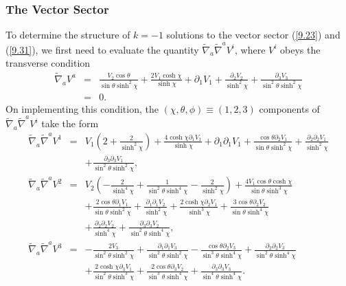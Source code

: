 \subsubsection{The Vector Sector}
\label{sss:vector_sector}

To determine the structure of $k=-1$ solutions to the vector sector  (\ref{9.23}) and (\ref{9.31}), we first need to evaluate the quantity $\tilde{\nabla}_a\tilde{\nabla}^aV^i$, where $V^i$ obeys the transverse condition 
%
\begin{eqnarray}
\tilde\nabla_a V^a&=& \frac{V_{2} \cos\theta}{\sin\theta \sinh^2\chi} + \frac{2 V_{1} \cosh\chi}{\sinh\chi} + \partial_{1}V_{1} + \frac{\partial_{2}V_{2}}{\sinh^2\chi} + \frac{\partial_{3}V_{3}}{\sin^2\theta \sinh^2\chi}
\nonumber\\
&=&0.
\label{10.20b}
\end{eqnarray}
%
On implementing this condition, the $(\chi,\theta,\phi) \equiv (1,2,3)$ components of $\tilde{\nabla}_a\tilde{\nabla}^aV^i$ take the form
% 
\begin{eqnarray}
\tilde{\nabla}_a\tilde{\nabla}^aV^1&=&V_{1} \left(2 + \frac{2}{\sinh^2\chi}\right) + \frac{4 \cosh\chi \partial_{1}V_{1}}{\sinh\chi} + \partial_{1}\partial_{1}V_{1} + \frac{\cos\theta \partial_{2}V_{1}}{\sin\theta \sinh^2\chi} + \frac{\partial_{2}\partial_{2}V_{1}}{\sinh^2\chi}
\nonumber\\
&& + \frac{\partial_{3}\partial_{3}V_{1}}{\sin^2\theta \sinh^2\chi},
\nonumber\\ 
\tilde{\nabla}_a\tilde{\nabla}^aV^2&=& V_{2} \left(- \frac{2}{\sinh^4\chi} + \frac{1}{\sin^2\theta \sinh^4\chi} -  \frac{2}{\sinh^2\chi}\right) + \frac{4 V_{1} \cos\theta \cosh\chi}{\sin\theta \sinh^3\chi}
\nonumber\\
&& + \frac{2 \cos\theta \partial_{1}V_{1}}{\sin\theta \sinh^2\chi} + \frac{\partial_{1}\partial_{1}V_{2}}{\sinh^2\chi}  + \frac{2 \cosh\chi \partial_{2}V_{1}}{\sinh^3\chi} + \frac{3 \cos\theta \partial_{2}V_{2}}{\sin\theta \sinh^4\chi}
\nonumber\\
&& + \frac{\partial_{2}\partial_{2}V_{2}}{\sinh^4\chi} + \frac{\partial_{3}\partial_{3}V_{2}}{\sin^2\theta \sinh^4\chi},
\nonumber\\ 
\tilde{\nabla}_a\tilde{\nabla}^aV^3&=& - \frac{2 V_{3}}{\sin^2\theta \sinh^2\chi} + \frac{\partial_{1}\partial_{1}V_{3}}{\sin^2\theta \sinh^2\chi} -  \frac{\cos\theta \partial_{2}V_{3}}{\sin^3\theta \sinh^4\chi} + \frac{\partial_{2}\partial_{2}V_{3}}{\sin^2\theta \sinh^4\chi}
\nonumber\\
&& + \frac{2 \cosh\chi \partial_{3}V_{1}}{\sin^2\theta \sinh^3\chi} + \frac{2 \cos\theta \partial_{3}V_{2}}{\sin^3\theta \sinh^4\chi} + \frac{\partial_{3}\partial_{3}V_{3}}{\sin^4\theta \sinh^4\chi}.
\label{10.21b}
\end{eqnarray}
